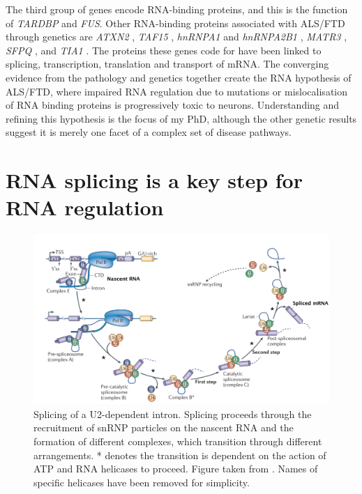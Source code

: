 The third group of genes encode RNA-binding proteins, and this is the function of \textit{TARDBP} and \textit{FUS}. 
Other RNA-binding proteins associated with ALS/FTD through genetics are \textit{ATXN2} \citep{Elden2010}, \textit{TAF15} \citep{Ticozzi2011}, \textit{hnRNPA1} and \textit{hnRNPA2B1} \citep{Kim2013}, \textit{MATR3} \citep{Johnson2014}, \textit{SFPQ} \citep{Thomas-Jinu2017}, and \textit{TIA1} \citep{Mackenzie2017}. 
The proteins these genes code for have been linked to splicing, transcription, translation and transport of mRNA. 
The converging evidence from the pathology and genetics together create the RNA hypothesis of ALS/FTD, where impaired RNA regulation due to mutations or mislocalisation of RNA binding proteins is progressively toxic to neurons. 
Understanding and refining this hypothesis is the focus of my PhD, although the other genetic results suggest it is merely one facet of a complex set of disease pathways.

\section{RNA splicing is a key step for RNA regulation}

\begin{figure}[h!]
	\centering
	\includegraphics[width=\textwidth]{Figures/01_introduction/splicing.png}
	\caption{
		Splicing of a U2-dependent intron.
		Splicing proceeds through the recruitment of snRNP particles on the nascent RNA and the formation of different complexes, which transition through different arrangements. 
		* denotes the transition is dependent on the action of ATP and RNA helicases to proceed.
		Figure taken from \citep{Matera2014}. Names of specific helicases have been removed for simplicity.
	 }
	\label{fig:intro_splicing}
\end{figure}

